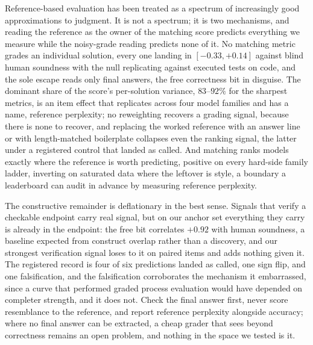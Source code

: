 \documentclass[11pt]{article}
\begin{document}
Reference-based evaluation has been treated as a spectrum of increasingly good approximations to judgment.
It is not a spectrum; it is two mechanisms, and reading the reference as the owner of the matching score predicts everything we measure while the noisy-grade reading predicts none of it.
No matching metric grades an individual solution, every one landing in $[-0.33, +0.14]$ against blind human soundness with the null replicating against executed tests on code, and the sole escape reads only final answers, the free correctness bit in disguise.
The dominant share of the score's per-solution variance, $83$--$92\%$ for the sharpest metrics, is an item effect that replicates across four model families and has a name, reference perplexity; no reweighting recovers a grading signal, because there is none to recover, and replacing the worked reference with an answer line or with length-matched boilerplate collapses even the ranking signal, the latter under a registered control that landed as called.
And matching ranks models exactly where the reference is worth predicting, positive on every hard-side family ladder, inverting on saturated data where the leftover is style, a boundary a leaderboard can audit in advance by measuring reference perplexity.

The constructive remainder is deflationary in the best sense.
Signals that verify a checkable endpoint carry real signal, but on our anchor set everything they carry is already in the endpoint: the free bit correlates $+0.92$ with human soundness, a baseline expected from construct overlap rather than a discovery, and our strongest verification signal loses to it on paired items and adds nothing given it.
The registered record is four of six predictions landed as called, one sign flip, and one falsification, and the falsification corroborates the mechanism it embarrassed, since a curve that performed graded process evaluation would have depended on completer strength, and it does not.
Check the final answer first, never score resemblance to the reference, and report reference perplexity alongside accuracy; where no final answer can be extracted, a cheap grader that sees beyond correctness remains an open problem, and nothing in the space we tested is it.

\enlargethispage{4\baselineskip}
{\small


}
\end{document}
